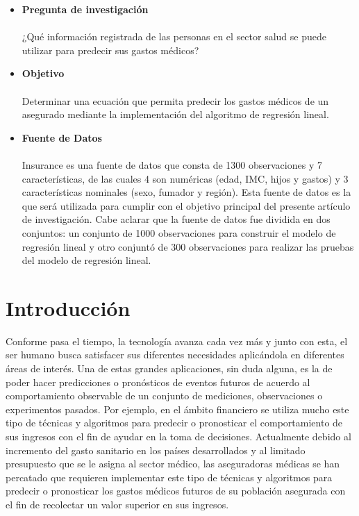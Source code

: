 \documentclass[letterpaper, 10 pt, conference]{ieeeconf}
\begin{document}
\begin{itemize}[leftmargin=*]
    \item \textbf{Pregunta de investigación}
    \\ \\¿Qué información registrada de las personas en el sector salud se puede utilizar para predecir sus gastos médicos?\\
    
    \item \textbf{Objetivo}
    \\ \\ Determinar una ecuación que permita predecir los gastos médicos de un asegurado mediante la implementación del algoritmo de regresión lineal.\\
    
    \item \textbf{Fuente de Datos}
    \\ \\ Insurance \cite{dataset:2019} es una fuente de datos que consta de 1300 observaciones y 7 características, de las cuales 4 son numéricas (edad, IMC, hijos y gastos) y 3 características nominales (sexo, fumador y región). Esta fuente de datos es la que será utilizada para cumplir con el objetivo principal del presente artículo de investigación. Cabe aclarar que la fuente de datos fue dividida en dos conjuntos: un conjunto de 1000 observaciones para construir el modelo de regresión lineal y otro conjuntó de 300 observaciones para realizar las pruebas del modelo de regresión lineal.
\end{itemize}

\section{Introducción}

Conforme pasa el tiempo, la tecnología avanza cada vez más y junto con esta, el ser humano busca satisfacer sus diferentes necesidades aplicándola en diferentes áreas de interés. Una de estas grandes aplicaciones, sin duda alguna, es la de poder hacer predicciones o pronósticos de eventos futuros de acuerdo al comportamiento observable de un conjunto de mediciones, observaciones o experimentos pasados. Por ejemplo, en el ámbito financiero se utiliza mucho este tipo de técnicas y algoritmos para predecir o pronosticar el comportamiento de sus ingresos con el fin de ayudar en la toma de decisiones. Actualmente debido al incremento del gasto sanitario en los países desarrollados y al limitado presupuesto que se le asigna al sector médico, las aseguradoras médicas se han percatado que requieren implementar este tipo de técnicas y algoritmos para predecir o pronosticar los gastos médicos futuros de su población asegurada con el fin de recolectar un valor superior en sus ingresos.
\end{document}
